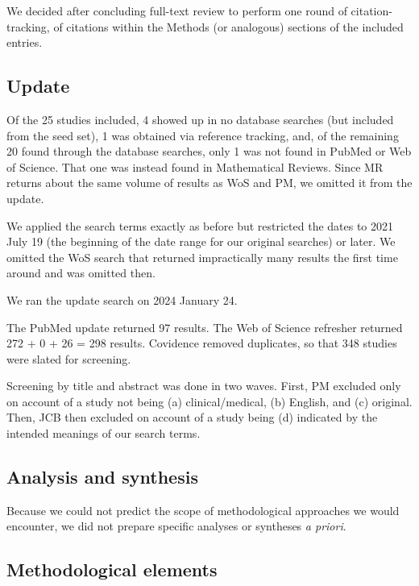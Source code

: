\documentclass{article}
\begin{document}
We decided after concluding full-text review to perform one round of
citation-tracking, of citations within the Methods (or analogous)
sections of the included entries.

\hypertarget{update}{%
\subsection*{Update}\label{update}}

Of the 25 studies included, 4 showed up in no database searches (but
included from the seed set), 1 was obtained via reference tracking, and,
of the remaining 20 found through the database searches, only 1 was not
found in PubMed or Web of Science. That one was instead found in
Mathematical Reviews. Since MR returns about the same volume of results
as WoS and PM, we omitted it from the update.

We applied the search terms exactly as before but restricted the dates
to 2021 July 19 (the beginning of the date range for our original
searches) or later. We omitted the WoS search that returned
impractically many results the first time around and was omitted then.

We ran the update search on 2024 January 24.

The PubMed update returned 97 results. The Web of Science refresher
returned 272 + 0 + 26 = 298 results. Covidence removed duplicates, so
that 348 studies were slated for screening.

Screening by title and abstract was done in two waves. First, PM
excluded only on account of a study not being (a) clinical/medical, (b)
English, and (c) original. Then, JCB then excluded on account of a study
being (d) indicated by the intended meanings of our search terms.

\hypertarget{analysis-and-synthesis}{%
\subsection*{Analysis and synthesis}\label{analysis-and-synthesis}}

Because we could not predict the scope of methodological approaches we
would encounter, we did not prepare specific analyses or syntheses
\emph{a priori}.

\hypertarget{methodological-elements}{%
\subsection*{Methodological elements}\label{methodological-elements}}
\end{document}
